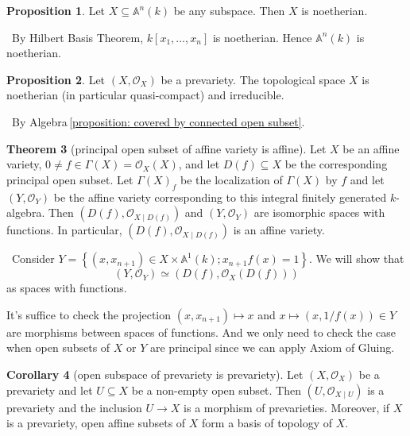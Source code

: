 \documentclass[12pt,a4paper]{book}
\newenvironment{prooff}{{\noindent\it\textcolor{cyan!40!black}{Proof}:}\,}{\par}
\newcommand{\bb}[1]{\mathbb{#1}}
\theoremstyle{definition}
\newtheorem{defn}{Definition}[section]
\newtheorem{coro}[defn]{Corollary}
\newtheorem{theo}[defn]{Theorem}
\newtheorem{prop}[defn]{Proposition}
\begin{document}
\begin{prop}
    Let $X \subseteq \mathbb{A}^n(k)$ be any subspace. Then $X$ is noetherian.
\end{prop}
\begin{prooff}
    By Hilbert Basis Theorem, $k[x_1,\dots,x_n]$ is noetherian. Hence $\bb{A}^n(k)$
    is noetherian.
\end{prooff}
\begin{prop}
    Let $\left(X, \mathscr{O}_X\right)$ be a prevariety. The topological space $X$ is noetherian (in particular quasi-compact) and irreducible.
\end{prop}
\begin{prooff}
    By Algebra\,\ref{proposition: covered by connected open subset}.
\end{prooff}
\begin{theo}[principal open subset of affine variety is affine]
    Let $X$ be an affine variety, $0\neq f \in \Gamma(X)=\mathscr{O}_X(X)$, and let $D(f) \subseteq X$ be the corresponding principal open subset. 
    Let $\Gamma(X)_f$ be the localization of $\Gamma(X)$ by $f$ and let $\left(Y, \mathscr{O}_Y\right)$ be the affine variety corresponding to this integral finitely generated $k$-algebra. 
    Then $\left(D(f), \mathscr{O}_{X \mid D(f)}\right)$ and $\left(Y, \mathscr{O}_Y\right)$ are isomorphic spaces with functions. In particular, $\left(D(f), \mathscr{O}_{X \mid D(f)}\right)$ is an affine variety. 
\end{theo}
\begin{prooff}
    Consider $ Y=\left\{\left(x, x_{n+1}\right) \in X \times \mathbb{A}^1(k) ; x_{n+1} f(x)=1\right\}$. We will show that 
    $$(Y,\mathscr{O}_Y)\simeq \left(D(f), \mathscr{O}_{X}(D(f))\right)$$ as spaces with functions.
    
    It's suffice to check the projection $(x,x_{n+1})\mapsto x$ and 
    $x\mapsto (x, 1/f(x))\in Y$ are morphisms between spaces of functions. 
    And we only need to check the case when open subsets of $X$ or $Y$ are principal since 
    we can apply Axiom of Gluing. 
\end{prooff}
\begin{coro}[open subspace of prevariety is prevariety]
    Let $\left(X, \mathscr{O}_X\right)$ be a prevariety and let $U \subseteq X$ be a non-empty open subset. Then $\left(U, \mathscr{O}_{X \mid U}\right)$ is a prevariety and the inclusion $U \rightarrow X$ 
    is a morphism of prevarieties. Moreover, if $X$ is a prevariety, open affine subsets of $X$
    form a basis of topology of $X$.
\end{coro}
    
\end{document}
